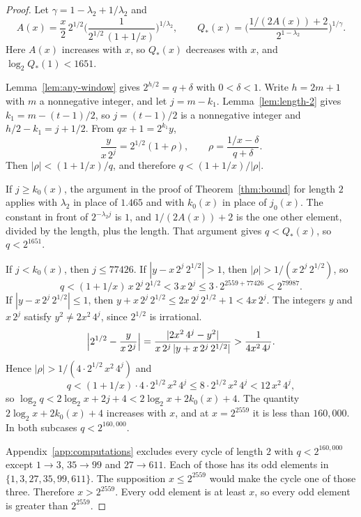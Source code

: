 \documentclass[11pt]{article}
\begin{document}
\begin{proof}
Let $\gamma = 1 - \lambda_2 + 1/\lambda_2$ and
\[
A(x) = \frac{x}{2}\, 2^{1/2}
\Biggl( \frac{1}{2^{1/2}\,(1+1/x)} \Biggr)^{1/\lambda_2},
\qquad
Q_*(x) = \Biggl( \frac{1/(2A(x)) + 2}{2^{1-\lambda_2}} \Biggr)^{1/\gamma}.
\]
Here $A(x)$ increases with $x$, so $Q_*(x)$ decreases with $x$, and $\log_2 Q_*(1) < 1651$.

Lemma~\ref{lem:any-window} gives $2^{h/2} = q + \delta$ with $0 < \delta < 1$.
Write $h = 2m + 1$ with $m$ a nonnegative integer, and let $j = m - k_1$.
Lemma~\ref{lem:length-2} gives $k_1 = m - (t-1)/2$, so $j = (t-1)/2$ is a nonnegative integer and $h/2 - k_1 = j + 1/2$.
From $qx + 1 = 2^{k_1} y$,
\[
\frac{y}{x\, 2^{j}} = 2^{1/2}(1 + \rho), \qquad \rho = \frac{1/x - \delta}{q + \delta}.
\]
Then $|\rho| < (1 + 1/x)/q$, and therefore $q < (1 + 1/x)/|\rho|$.

If $j \ge k_0(x)$, the argument in the proof of Theorem~\ref{thm:bound} for length $2$ applies with $\lambda_2$ in place of $1.465$ and with $k_0(x)$ in place of $j_0(x)$.
The constant in front of $2^{-\lambda_2 j}$ is $1$, and $1/(2A(x)) + 2$ is the one other element, divided by the length, plus the length.
That argument gives $q < Q_*(x)$, so $q < 2^{1651}$.

If $j < k_0(x)$, then $j \le 77426$.
If $|y - x\, 2^{j}\, 2^{1/2}| > 1$, then $|\rho| > 1/(x\, 2^{j}\, 2^{1/2})$, so
\[
q < (1 + 1/x)\, x\, 2^{j}\, 2^{1/2} < 3\, x\, 2^{j} \le 3 \cdot 2^{2559 + 77426} < 2^{79987}.
\]
If $|y - x\, 2^{j}\, 2^{1/2}| \le 1$, then $y + x\, 2^{j}\, 2^{1/2} \le 2x\, 2^{j}\, 2^{1/2} + 1 < 4x\, 2^{j}$.
The integers $y$ and $x\, 2^{j}$ satisfy $y^2 \ne 2x^2\, 4^{j}$, since $2^{1/2}$ is irrational.
\[
\Bigl| 2^{1/2} - \frac{y}{x\, 2^{j}} \Bigr| = \frac{|2x^2\, 4^{j} - y^2|}{x\, 2^{j}\, |y + x\, 2^{j}\, 2^{1/2}|} > \frac{1}{4x^2\, 4^{j}}.
\]
Hence $|\rho| > 1/(4 \cdot 2^{1/2}\, x^2\, 4^{j})$ and
\[
q < (1 + 1/x) \cdot 4 \cdot 2^{1/2}\, x^2\, 4^{j} \le 8 \cdot 2^{1/2}\, x^2\, 4^{j} < 12\, x^2\, 4^{j},
\]
so $\log_2 q < 2\log_2 x + 2j + 4 < 2\log_2 x + 2k_0(x) + 4$.
The quantity $2\log_2 x + 2k_0(x) + 4$ increases with $x$, and at $x = 2^{2559}$ it is less than $160{,}000$.
In both subcases $q < 2^{160{,}000}$.

Appendix~\ref{app:computations} excludes every cycle of length $2$ with $q < 2^{160{,}000}$ except $1 \to 3$, $35 \to 99$ and $27 \to 611$.
Each of those has its odd elements in $\{1, 3, 27, 35, 99, 611\}$.
The supposition $x \le 2^{2559}$ would make the cycle one of those three.
Therefore $x > 2^{2559}$.
Every odd element is at least $x$, so every odd element is greater than $2^{2559}$.
\end{proof}
\end{document}
